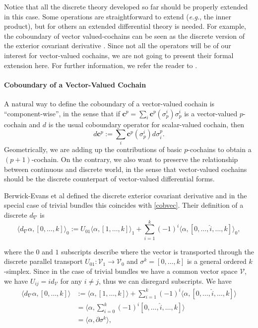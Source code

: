 \documentclass{article}
\theoremstyle{definition} %
\theoremstyle{plain} %
\theoremstyle{remark} %
\newcommand{\cc}{\mathbf{c}}
\begin{document}
Notice that all the discrete theory developed so far should be properly extended in this case. Some operations are straightforward to extend (\textsl{e.g.}, the inner product), but for others an extended differential theory is needed.
For example, the coboundary of vector valued-cochains can be seen as the discrete version of the exterior covariant derivative \cite{berwick2021discrete}.
Since not all the operators will be of our interest for vector-valued cochains, we are not going to present their formal extension here. For further information, we refer the reader to \cite{berwick2021discrete}.

\paragraph{Coboundary of a Vector-Valued Cochain} A natural way to define the coboundary of a vector-valued cochain is ``component-wise'', in the sense that if $\mathbf{c}^p = \sum_i \cc^p(\sigma^i_p)  \sigma^i_p$ is a vector-valued $p$-cochain and $d$ is the usual coboundary operator for scalar-valued cochain, then
\begin{equation}
    d \cc^p := \sum_i \cc^p(\sigma^i_p) d \sigma^p_i. \label{cobvec}
\end{equation}
Geometrically, we are adding up the contributions of basic $p$-cochains to obtain a $(p+1)$-cochain. On the contrary, we also want to preserve the relationship between continuous and discrete world, in the sense that vector-valued cochains should be the discrete counterpart of vector-valued differential forms. 

Berwick-Evans et al \cite{berwick2021discrete} defined the discrete exterior covariant derivative and in the special case of trivial bundles this coincides with \eqref{cobvec}. Their definition of a discrete $d_\nabla$ is
$$\langle d_\nabla \alpha, [0,\dots, k] \rangle_0 := U_{01}\langle \alpha, [1,\dots,k] \rangle_1 + \sum_{i=1}^k (-1)^i \langle \alpha, [0, \dots, \hat{i}, \dots, k] \rangle_0,$$

where the $0$ and $1$ subscripts describe where the vector is transported through the discrete parallel transport $U_{01}: \mathcal{V}_1 \rightarrow \mathcal{V}_0$ and $\sigma^k = [0,\dots, k]$ is a general ordered $k$-simplex. Since in the case of trivial bundles we have a common vector space $\mathcal{V}$, we have $U_{ij} = id_{\mathcal{V}}$ for any $i \neq j$, thus we can disregard subscripts. We have
\begin{equation*}
    \begin{split}
        \langle d_\nabla \alpha, [0,\dots, k] \rangle &:= \langle \alpha, [1,\dots,k] \rangle + \sum_{i=1}^k (-1)^i \langle \alpha, [0, \dots, \hat{i}, \dots, k] \rangle\\
        & = \langle \alpha, \sum^k_{i=0} (-1)^i [0, \dots, \hat{i}, \dots, k] \rangle\\
        &= \langle \alpha, \partial \sigma^k \rangle,
    \end{split}
\end{equation*}
\end{document}
